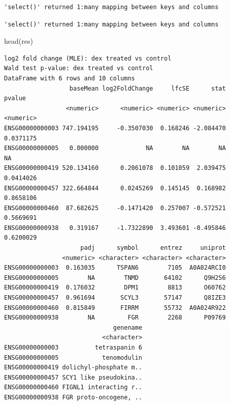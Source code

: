 \documentclass[
  letterpaper,
  DIV=11,
  numbers=noendperiod]{scrartcl}
\newenvironment{Shaded}{\begin{snugshade}}{\end{snugshade}}
\newcommand{\AttributeTok}[1]{\textcolor[rgb]{0.40,0.45,0.13}{#1}}
\newcommand{\FunctionTok}[1]{\textcolor[rgb]{0.28,0.35,0.67}{#1}}
\newcommand{\NormalTok}[1]{\textcolor[rgb]{0.00,0.23,0.31}{#1}}
\newcommand{\OtherTok}[1]{\textcolor[rgb]{0.00,0.23,0.31}{#1}}
\newcommand{\SpecialCharTok}[1]{\textcolor[rgb]{0.37,0.37,0.37}{#1}}
\newcommand{\StringTok}[1]{\textcolor[rgb]{0.13,0.47,0.30}{#1}}
\begin{document}
\begin{verbatim}
'select()' returned 1:many mapping between keys and columns
\end{verbatim}

\begin{Shaded}
\end{Shaded}

\begin{verbatim}
'select()' returned 1:many mapping between keys and columns
\end{verbatim}

\begin{Shaded}
\begin{Highlighting}[]
\FunctionTok{head}\NormalTok{(res)}
\end{Highlighting}
\end{Shaded}

\begin{verbatim}
log2 fold change (MLE): dex treated vs control 
Wald test p-value: dex treated vs control 
DataFrame with 6 rows and 10 columns
                  baseMean log2FoldChange     lfcSE      stat    pvalue
                 <numeric>      <numeric> <numeric> <numeric> <numeric>
ENSG00000000003 747.194195     -0.3507030  0.168246 -2.084470 0.0371175
ENSG00000000005   0.000000             NA        NA        NA        NA
ENSG00000000419 520.134160      0.2061078  0.101059  2.039475 0.0414026
ENSG00000000457 322.664844      0.0245269  0.145145  0.168982 0.8658106
ENSG00000000460  87.682625     -0.1471420  0.257007 -0.572521 0.5669691
ENSG00000000938   0.319167     -1.7322890  3.493601 -0.495846 0.6200029
                     padj      symbol      entrez     uniprot
                <numeric> <character> <character> <character>
ENSG00000000003  0.163035      TSPAN6        7105  A0A024RCI0
ENSG00000000005        NA        TNMD       64102      Q9H2S6
ENSG00000000419  0.176032        DPM1        8813      O60762
ENSG00000000457  0.961694       SCYL3       57147      Q8IZE3
ENSG00000000460  0.815849       FIRRM       55732  A0A024R922
ENSG00000000938        NA         FGR        2268      P09769
                              genename
                           <character>
ENSG00000000003          tetraspanin 6
ENSG00000000005            tenomodulin
ENSG00000000419 dolichyl-phosphate m..
ENSG00000000457 SCY1 like pseudokina..
ENSG00000000460 FIGNL1 interacting r..
ENSG00000000938 FGR proto-oncogene, ..
\end{verbatim}
\end{document}
